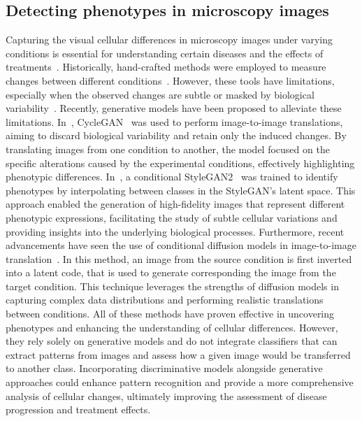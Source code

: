 \subsection{Detecting phenotypes in microscopy images}
Capturing the visual cellular differences in microscopy images under varying conditions is essential for understanding certain diseases and the effects of treatments~\cite{cellular_profiling,cellular_profiling_2,cellular_profiling_3, bourou,phenexp,bourou_2}. Historically, hand-crafted methods were employed to measure changes between different conditions~\cite{cellprofiler}. However, these tools have limitations, especially when the observed changes are subtle or masked by biological variability~\cite{phenexp,bourou_2}. Recently, generative models have been proposed to alleviate these limitations. In~\cite{bourou}, CycleGAN~\cite{cyclegan} was used to perform image-to-image translations, aiming to discard biological variability and retain only the induced changes. By translating images from one condition to another, the model focused on the specific alterations caused by the experimental conditions, effectively highlighting phenotypic differences. In~\cite{phenexp}, a conditional StyleGAN2~\cite{stylegan2} was trained to identify phenotypes by interpolating between classes in the StyleGAN's latent space. This approach enabled the generation of high-fidelity images that represent different phenotypic expressions, facilitating the study of subtle cellular variations and providing insights into the underlying biological processes. Furthermore, recent advancements have seen the use of conditional diffusion models in image-to-image translation~\cite{bourou_2}. In this method, an image from the source condition is first inverted into a latent code, that is used to generate corresponding the image from the target condition. This technique leverages the strengths of diffusion models in capturing complex data distributions and performing realistic translations between conditions. All of these methods have proven effective in uncovering phenotypes and enhancing the understanding of cellular differences. However, they rely solely on generative models and do not integrate classifiers that can extract patterns from images and assess how a given image would be transferred to another class. Incorporating discriminative models alongside generative approaches could enhance pattern recognition and provide a more comprehensive analysis of cellular changes, ultimately improving the assessment of disease progression and treatment effects.



